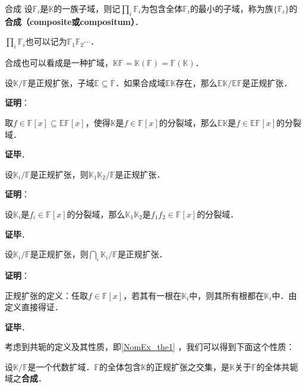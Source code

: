 \begin{definition}{合成}
设$\mathbb{F}_i$是$\mathbb{K}$的一族子域，则记$\prod_{i}\mathbb{F}_i$为包含全体$\mathbb{F}_i$的最小的子域，称为族$\{\mathbb{F}_i\}$的\textbf{合成（composite或compositum）}．

$\prod_{i}\mathbb{F}_i$也可以记为$\mathbb{F}_1\mathbb{F}_2\cdots$．
\end{definition}


合成也可以看成是一种扩域，$\mathbb{K}\mathbb{F}=\mathbb{K}(\mathbb{F})=\mathbb{F}(\mathbb{K})$．


\begin{theorem}{}
设$\mathbb{K}/\mathbb{F}$是正规扩张，子域$\mathbb{E}\subseteq\overline{\mathbb{F}}$．如果合成域$\mathbb{EK}$存在，那么$\mathbb{EK}/\mathbb{EF}$是正规扩张．
\end{theorem}

\textbf{证明}：

取$f\in\mathbb{F}[x]\subseteq\mathbb{EF}[x]$，使得$\mathbb{K}$是$f\in\mathbb{F}[x]$的分裂域，那么$\mathbb{EK}$是$f\in\mathbb{EF}[x]$的分裂域．

\textbf{证毕}．






\begin{theorem}{}
设$\mathbb{K}_i/\mathbb{F}$是正规扩张，则$\mathbb{K}_1\mathbb{K}_2/\mathbb{F}$是正规扩张．
\end{theorem}


\textbf{证明}：

设$\mathbb{K}_i$是$f_i\in\mathbb{F}[x]$的分裂域，那么$\mathbb{K}_1\mathbb{K}_2$是$f_1f_2\in\mathbb{F}[x]$的分裂域．

\textbf{证毕}．


\begin{theorem}{}\label{NomEx_the2}
设$\mathbb{K}_i/\mathbb{F}$是正规扩张，则$\bigcap_{i}\mathbb{K}_i/\mathbb{F}$是正规扩张．
\end{theorem}

\textbf{证明}：

正规扩张的定义：任取$f\in\mathbb{F}[x]$，若其有一根在$\mathbb{K}_i$中，则其所有根都在$\mathbb{K}_i$中．由定义直接得证．

\textbf{证毕}．


考虑到共轭的定义及其性质，即\autoref{NomEx_the1} ，我们可以得到下面这个性质：

\begin{theorem}{}
设$\mathbb{K}/\mathbb{F}$是一个代数扩域．$\mathbb{F}$的全体包含$\mathbb{K}$的正规扩张之交集，是$\mathbb{K}$关于$\mathbb{F}$的全体共轭域之\textbf{合成}．
\end{theorem}

